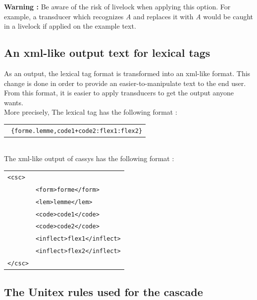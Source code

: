 \large{\textbf{Warning :}} Be aware of the risk of livelock when applying this
option. For example, a transducer which recognizes \emph{A} and replaces it with
\emph{A} would be caught in a livelock if applied on the example text.

\subsection{An xml-like output text for lexical tags}

As an output, the lexical tag format is transformed into an xml-like format.
This change is done in order to provide an easier-to-manipulate text to the end
user.
From this format, it is easier to apply transducers to get the output anyone
wants.\\

More precisely, The lexical tag has the following format :\\
\begin{tabular}{c}
\texttt{
\{forme.lemme,code1+code2:flex1:flex2\}}
\end{tabular}\\

The xml-like output of cassys has the following format :\\
\begin{tabular}{ll}
\texttt{<csc>}&\\
	&\texttt{<form>forme</form>}\\
	&\texttt{<lem>lemme</lem>}\\
	&\texttt{<code>code1</code>}\\
	&\texttt{<code>code2</code>}\\
	&\texttt{<inflect>flex1</inflect>}\\
	&\texttt{<inflect>flex2</inflect>}\\
\texttt{</csc>}&\\
\end{tabular}



\subsection{The Unitex rules used for the cascade}

